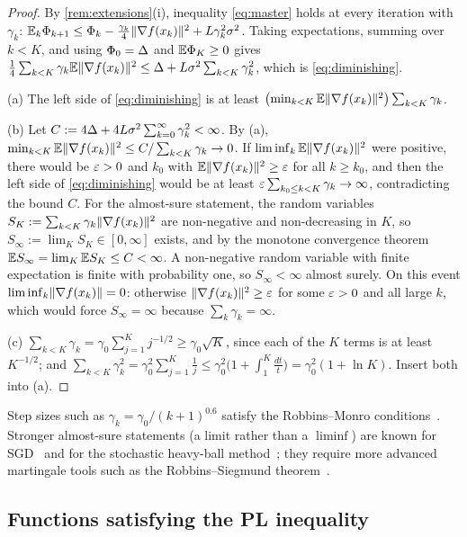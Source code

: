 \begin{proof}
By \cref{rem:extensions}(i), inequality \eqref{eq:master} holds at every iteration with
$\gamma_k$: $\mathbb{E}_k\Phi_{k+1}\le\Phi_k-\frac{\gamma_k}4\lVert \nabla f(x_k)\rVert^2+L\gamma_k^2\sigma^2$.
Taking expectations, summing over $k<K$, and using $\Phi_0=\Delta$ and $\mathbb{E}\Phi_K\ge0$ gives
$\frac14\sum_{k<K}\gamma_k\mathbb{E}\lVert \nabla f(x_k)\rVert^2\le\Delta+L\sigma^2\sum_{k<K}\gamma_k^2$,
which is \eqref{eq:diminishing}.

(a) The left side of \eqref{eq:diminishing} is at least
$\bigl(\min_{k<K}\mathbb{E}\lVert \nabla f(x_k)\rVert^2\bigr)\sum_{k<K}\gamma_k$.

(b) Let $C:=4\Delta+4L\sigma^2\sum_{k=0}^\infty\gamma_k^2<\infty$. By (a),
$\min_{k<K}\mathbb{E}\lVert \nabla f(x_k)\rVert^2\le C/\sum_{k<K}\gamma_k\to0$. If
$\liminf_k\mathbb{E}\lVert \nabla f(x_k)\rVert^2$ were positive, there would be $\varepsilon>0$ and $k_0$ with
$\mathbb{E}\lVert \nabla f(x_k)\rVert^2\ge\varepsilon$ for all $k\ge k_0$, and then the left side of
\eqref{eq:diminishing} would be at least $\varepsilon\sum_{k_0\le k<K}\gamma_k\to\infty$,
contradicting the bound $C$. For the almost-sure statement, the random variables
$S_K:=\sum_{k<K}\gamma_k\lVert \nabla f(x_k)\rVert^2$ are non-negative and non-decreasing in
$K$, so $S_\infty:=\lim_KS_K\in[0,\infty]$ exists, and by the monotone convergence
theorem $\mathbb{E} S_\infty=\lim_K\mathbb{E} S_K\le C<\infty$. A non-negative random variable with finite
expectation is finite with probability one, so $S_\infty<\infty$ almost surely. On this
event $\liminf_k\lVert \nabla f(x_k)\rVert=0$: otherwise $\lVert \nabla f(x_k)\rVert^2\ge\varepsilon$ for some
$\varepsilon>0$ and all large $k$, which would force $S_\infty=\infty$ because $\sum_k\gamma_k=\infty$.

(c) $\sum_{k<K}\gamma_k=\gamma_0\sum_{j=1}^Kj^{-1/2}\ge\gamma_0\sqrt K$, since each of the
$K$ terms is at least $K^{-1/2}$; and
$\sum_{k<K}\gamma_k^2=\gamma_0^2\sum_{j=1}^K\frac1j\le\gamma_0^2\bigl(1+\int_1^K\frac{dt}{t}\bigr)=\gamma_0^2(1+\ln K)$.
Insert both into (a).
\end{proof}

Step sizes such as $\gamma_k=\gamma_0/(k+1)^{0.6}$ satisfy the Robbins--Monro
conditions~\cite{robbins1951}. Stronger almost-sure statements (a limit rather than a
$\liminf$) are known for SGD~\cite{bertsekas2000} and for the stochastic heavy-ball
method~\cite{gadat2018,sebbouh2021}; they require more advanced martingale tools such as
the Robbins--Siegmund theorem~\cite{robbinssiegmund1971}.

\subsection{Functions satisfying the PL inequality}

